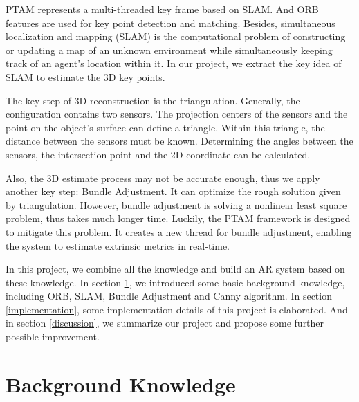 \documentclass[paper=a4, fontsize=14pt]{scrartcl}
\numberwithin{equation}{section}		%
\numberwithin{figure}{section}			%
\numberwithin{table}{section}				%
\begin{document}
PTAM represents a multi-threaded key frame based on SLAM.
And ORB\cite{rublee2011orb} features are used for key point detection and matching. Besides, simultaneous localization and mapping (SLAM) is the computational problem of constructing or updating a map of an unknown environment while simultaneously keeping track of an agent's location within it. 
In our project, we extract the key idea of SLAM to estimate the 3D key points.

The key step of 3D reconstruction is the triangulation\cite{hartley1997triangulation}.
Generally, the configuration contains two sensors.
The projection centers of the sensors and the point on the object's surface can define a triangle.
Within this triangle, the distance between the sensors must be known.
Determining the angles between the sensors, the intersection point and the 2D coordinate can be calculated.

Also, the 3D estimate process may not be accurate enough, thus we apply another key step: Bundle Adjustment\cite{triggs1999bundle}.
It can optimize the rough solution given by triangulation.
However, bundle adjustment is solving a nonlinear least square problem, thus takes much longer time.
Luckily, the PTAM framework is designed to mitigate this problem.
It creates a new thread for bundle adjustment, enabling the system to estimate extrinsic metrics in real-time.

In this project, we combine all the knowledge and build an AR system based on these knowledge.
In section \ref{background}, we introduced some basic background knowledge, including ORB, SLAM, Bundle Adjustment and Canny algorithm.
In section \ref{implementation}, some implementation details of this project is elaborated.
And in section \ref{discussion}, we summarize our project and propose some further possible improvement.

\newpage
\section{Background Knowledge}\label{background}
\end{document}

